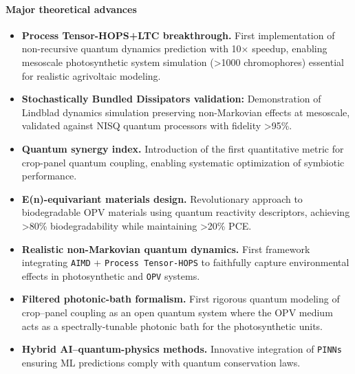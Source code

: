 \documentclass[12pt, a4paper]{article}
\begin{document}
\paragraph{Major theoretical advances}
\begin{itemize}
    \item \textbf{Process Tensor-HOPS+LTC breakthrough.} First implementation of non-recursive quantum dynamics prediction with 10× speedup, enabling mesoscale photosynthetic system simulation (>1000 chromophores) essential for realistic agrivoltaic modeling.
    
    \item \textbf{Stochastically Bundled Dissipators validation:} Demonstration of Lindblad dynamics simulation preserving non-Markovian effects at mesoscale, validated against NISQ quantum processors with fidelity >95\%.
    
    \item \textbf{Quantum synergy index.} Introduction of the first quantitative metric for crop-panel quantum coupling, enabling systematic optimization of symbiotic performance.
    
    \item \textbf{E(n)-equivariant materials design.} Revolutionary approach to biodegradable OPV materials using quantum reactivity descriptors, achieving >80\% biodegradability while maintaining >20\% PCE.

    \item \textbf{Realistic non-Markovian quantum dynamics.} First framework integrating \texttt{AIMD} + \texttt{Process Tensor-HOPS} to faithfully capture environmental effects in photosynthetic and \texttt{OPV} systems.
    
    \item \textbf{Filtered photonic-bath formalism.} First rigorous quantum modeling of crop–panel coupling as an open quantum system where the OPV medium acts as a spectrally-tunable photonic bath for the photosynthetic units.
    
    \item \textbf{Hybrid AI–quantum-physics methods.} Innovative integration of \texttt{PINNs} ensuring ML predictions comply with quantum conservation laws.
\end{itemize}
\end{document}
